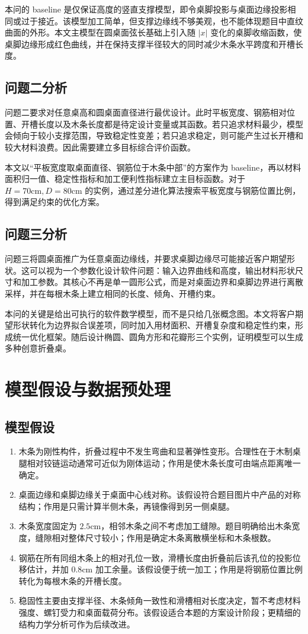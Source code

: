 \documentclass[UTF8,a4paper,12pt]{ctexart}
\newcommand{\cm}{\mathrm{cm}}
\begin{document}
本问的 baseline 是仅保证高度的竖直支撑模型，即令桌脚投影与桌面边缘投影相同或过于接近。该模型加工简单，但支撑边缘线不够美观，也不能体现题目中直纹曲面的外形。本文主模型在圆桌面弦长基础上引入随 $|x|$ 变化的桌脚收缩函数，使桌脚边缘形成红色曲线，并在保持支撑半径较大的同时减少木条水平跨度和开槽长度。

\subsection{问题二分析}
问题二要求对任意桌高和圆桌面直径进行最优设计。此时平板宽度、钢筋相对位置、开槽长度以及木条长度都是待定设计变量或其函数。若只追求材料最少，模型会倾向于较小支撑范围，导致稳定性变差；若只追求稳定，则可能产生过长开槽和较大材料浪费。因此需要建立多目标综合评价函数。

本文以“平板宽度取桌面直径、钢筋位于木条中部”的方案作为 baseline，再以材料面积归一值、稳定性指标和加工便利性指标建立主目标函数。对于 $H=70\cm,D=80\cm$ 的实例，通过差分进化算法搜索平板宽度与钢筋位置比例，得到满足约束的优化方案。

\subsection{问题三分析}
问题三将圆桌面推广为任意桌面边缘线，并要求桌脚边缘尽可能接近客户期望形状。这可以视为一个参数化设计软件问题：输入边界曲线和高度，输出材料形状尺寸和加工参数。其核心不再是单一圆形公式，而是对桌面边界和桌脚边界进行离散采样，并在每根木条上建立相同的长度、倾角、开槽约束。

本问的关键是给出可执行的软件数学模型，而不是只给几张概念图。本文将客户期望形状转化为边界拟合误差项，同时加入用材面积、开槽复杂度和稳定性约束，形成统一优化框架。随后设计椭圆、圆角方形和花瓣形三个实例，证明模型可以生成多种创意折叠桌。

\section{模型假设与数据预处理}
\subsection{模型假设}
\begin{enumerate}
\item 木条为刚性构件，折叠过程中不发生弯曲和显著弹性变形。合理性在于木制桌腿相对铰链运动通常可近似为刚体运动；作用是使木条长度可由端点距离唯一确定。
\item 桌面边缘和桌脚边缘关于桌面中心线对称。该假设符合题目图片中产品的对称结构；作用是只需计算半侧木条，再镜像得到另一侧桌腿。
\item 木条宽度固定为 $2.5\cm$，相邻木条之间不考虑加工缝隙。题目明确给出木条宽度，缝隙相对整体尺寸较小；作用是确定木条离散横坐标和木条根数。
\item 钢筋在所有同组木条上的相对孔位一致，滑槽长度由折叠前后该孔位的投影位移估计，并加 $0.8\cm$ 加工余量。该假设便于统一加工；作用是将钢筋位置比例转化为每根木条的开槽长度。
\item 稳固性主要由支撑半径、木条倾角一致性和滑槽相对长度决定，暂不考虑材料强度、螺钉受力和桌面载荷分布。该假设适合本题的方案设计阶段；更精细的结构力学分析可作为后续改进。
\end{enumerate}
\end{document}
